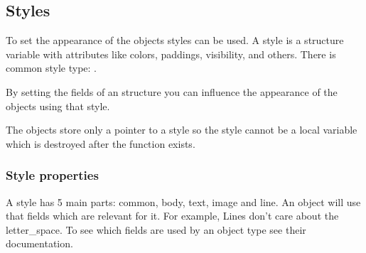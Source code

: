 \documentclass[letterpaper,10pt,english]{sphinxmanual}
\begin{document}
\subsection{Styles}
\label{\detokenize{overview/styles:styles}}\label{\detokenize{overview/styles::doc}}
To set the appearance of the objects styles can be used. A style is a structure variable with attributes like colors, paddings, visibility, and others. There is common style type: .

By setting the fields of an  structure you can influence the appearance of the objects using that style.

The objects store only a pointer to a style so the style cannot be a local variable which is destroyed after the function exists. 

%
\begin{sphinxVerbatim}[commandchars=\\\{\}]
              
        
  
        
              

\end{sphinxVerbatim}


\subsubsection{Style properties}
\label{\detokenize{overview/styles:style-properties}}
A style has 5 main parts: common, body, text, image and line. An object will use that fields which are relevant for it. For example, Lines don’t care about the letter\_space. To see which fields are used by an object type see their documentation.
\end{document}
